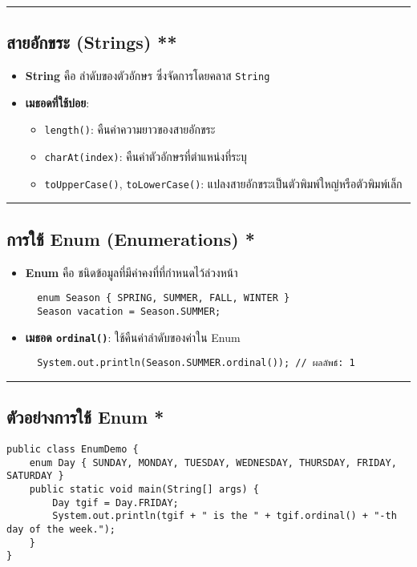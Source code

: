 \documentclass[11pt]{article}
\begin{document}
\noindent\rule{\textwidth}{0.5pt}
\subsection{สายอักขระ (Strings) **}
\label{sec:orgcf2b760}
\begin{itemize}
\item \textbf{String} คือ ลำดับของตัวอักษร ซึ่งจัดการโดยคลาส \texttt{String}
\item \textbf{เมธอดที่ใช้บ่อย}:
\begin{itemize}
\item \texttt{length()}: คืนค่าความยาวของสายอักขระ
\item \texttt{charAt(index)}: คืนค่าตัวอักษรที่ตำแหน่งที่ระบุ
\item \texttt{toUpperCase()}, \texttt{toLowerCase()}: แปลงสายอักขระเป็นตัวพิมพ์ใหญ่หรือตัวพิมพ์เล็ก
\end{itemize}
\end{itemize}

\noindent\rule{\textwidth}{0.5pt}
\subsection{การใช้ Enum (Enumerations) \textbf{*}}
\label{sec:org23d3081}
\begin{itemize}
\item \textbf{Enum} คือ ชนิดข้อมูลที่มีค่าคงที่ที่กำหนดไว้ล่วงหน้า

\begin{verbatim}
  enum Season { SPRING, SUMMER, FALL, WINTER }
  Season vacation = Season.SUMMER;
\end{verbatim}

\item \textbf{เมธอด \texttt{ordinal()}}: ใช้คืนค่าลำดับของค่าใน Enum

\begin{verbatim}
  System.out.println(Season.SUMMER.ordinal()); // ผลลัพธ์: 1
\end{verbatim}
\end{itemize}

\noindent\rule{\textwidth}{0.5pt}
\subsection{ตัวอย่างการใช้ Enum \textbf{*}}
\label{sec:org1f70104}
\begin{verbatim}
public class EnumDemo {
    enum Day { SUNDAY, MONDAY, TUESDAY, WEDNESDAY, THURSDAY, FRIDAY, SATURDAY }
    public static void main(String[] args) {
        Day tgif = Day.FRIDAY;
        System.out.println(tgif + " is the " + tgif.ordinal() + "-th day of the week.");
    }
}
\end{verbatim}
\end{document}
